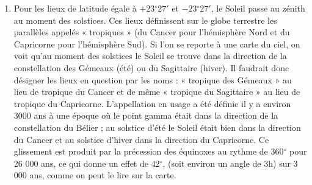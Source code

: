 \documentclass[a4paper,10pt]{report}
\renewcommand{\deg}{\ensuremath{^{\circ}}}
\begin{document}
\begin{Answer}
\begin{enumerate}
  \item Pour les lieux de latitude égale à $+23\deg27'$ et
    $-23\deg27'$, le Soleil passe au zénith au moment des
    solstices. Ces lieux définissent sur le globe terrestre les
    parallèles appelés « tropiques » (du Cancer pour l'hémisphère Nord
    et du Capricorne pour l'hémisphère Sud). Si l'on se reporte à une
    carte du ciel, on voit qu'au moment des solstices le Soleil se
    trouve dans la direction de la constellation des Gémeaux (été) ou
    du Sagittaire (hiver). Il faudrait donc désigner les lieux en
    question par les noms : « tropique des Gémeaux » au lieu de
    tropique du Cancer et de même « tropique du Sagittaire » au lieu
    de tropique du Capricorne. L'appellation en usage a été définie il
    y a environ 3000 ans à une époque où le point gamma était dans la
    direction de la constellation du Bélier ; au solstice d'été le
    Soleil était bien dans la direction du Cancer et au solstice
    d'hiver dans la direction du Capricorne. Ce glissement est produit
    par la précession des équinoxes au rythme de $360\deg$ pour 26
    000 ans, ce qui donne un effet de $42\deg$, (soit environ un
    angle de 3h) sur 3 000 ans, comme on peut le lire sur la carte.
\end{enumerate}
\end{Answer}
\end{document}
